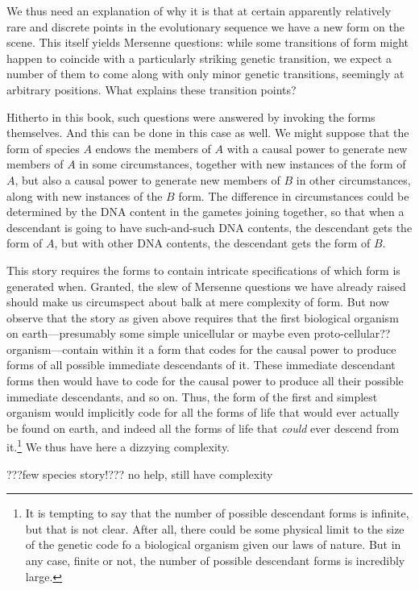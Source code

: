 We thus need an explanation of why it is that at certain apparently relatively rare and discrete points in the evolutionary 
sequence we have a new form on the scene. This itself yields Mersenne questions: while some transitions of form might happen
to coincide with a particularly striking genetic transition, we expect a number of them to come along with only minor
genetic transitions, seemingly at arbitrary positions. What explains these transition points?

Hitherto in this book, such questions were answered by invoking the forms themselves. And this can be done in this case
as well. We might suppose that the form of species $A$ endows the members of $A$ with a causal power to generate new
members of $A$ in some circumstances, together with new instances of the form of $A$, but also a causal power to generate
new members of $B$ in other circumstances, along with new instances of the $B$ form. The difference in circumstances could be
determined by the DNA content in the gametes joining together, so that when a descendant is going to have such-and-such DNA 
contents, the descendant gets the form of $A$, but with other DNA contents, the descendant gets the form of $B$. 

This story requires the forms to contain intricate specifications of which form is generated when. Granted, the slew 
of Mersenne questions we have already raised should make us circumspect about balk at mere complexity of form.
But now observe that the story as given above requires that the first biological organism on earth---presumably
some simple unicellular or maybe even proto-cellular?? organism---contain within it a form that codes for the causal
power to produce forms of all possible immediate descendants of it. These immediate descendant forms then would have 
to code for the causal power to produce all their possible immediate descendants, and so on. Thus, the
form of the first and simplest organism would implicitly code for all the forms of life that would ever actually be
found on earth, and indeed all the forms of life that \textit{could} ever descend from it.\footnote{It is tempting to
say that the number of possible descendant forms is infinite, but that is not clear. After all, there could be some
physical limit to the size of the genetic code fo a biological organism given our laws of nature. But in any case,
finite or not, the number of possible descendant forms is incredibly large.} We thus have here a dizzying complexity.

???few species story!??? no help, still have complexity

